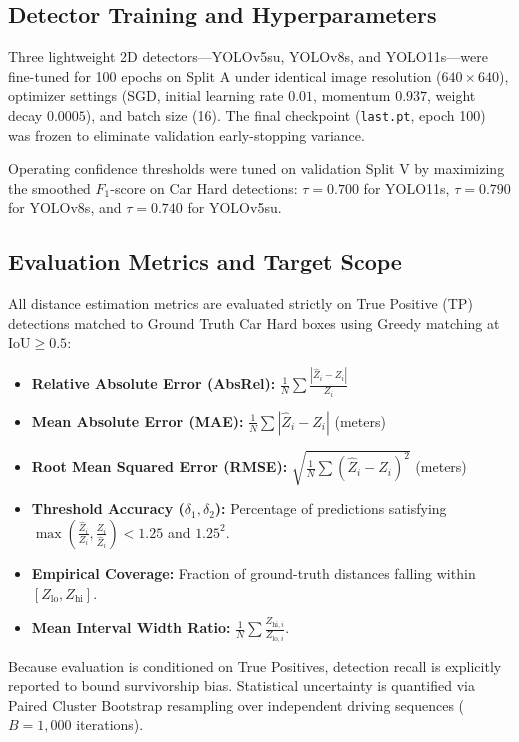 \documentclass[]{spie}  %
\begin{document}
\subsection{Detector Training and Hyperparameters}
Three lightweight 2D detectors---YOLOv5su, YOLOv8s, and YOLO11s---were fine-tuned for 100 epochs on Split A under identical image resolution ($640 \times 640$), optimizer settings (SGD, initial learning rate $0.01$, momentum $0.937$, weight decay $0.0005$), and batch size (16). The final checkpoint (\texttt{last.pt}, epoch 100) was frozen to eliminate validation early-stopping variance.

Operating confidence thresholds were tuned on validation Split V by maximizing the smoothed $F_1$-score on Car Hard detections: $\tau = 0.700$ for YOLO11s, $\tau = 0.790$ for YOLOv8s, and $\tau = 0.740$ for YOLOv5su.

\subsection{Evaluation Metrics and Target Scope}
All distance estimation metrics are evaluated strictly on True Positive (TP) detections matched to Ground Truth Car Hard boxes using Greedy matching at $\text{IoU} \ge 0.5$:
\begin{itemize}
    \item \textbf{Relative Absolute Error (AbsRel):} $\frac{1}{N} \sum \frac{|\hat{Z}_i - Z_i|}{Z_i}$
    \item \textbf{Mean Absolute Error (MAE):} $\frac{1}{N} \sum |\hat{Z}_i - Z_i|$ (meters)
    \item \textbf{Root Mean Squared Error (RMSE):} $\sqrt{\frac{1}{N} \sum (\hat{Z}_i - Z_i)^2}$ (meters)
    \item \textbf{Threshold Accuracy ($\delta_1, \delta_2$):} Percentage of predictions satisfying $\max(\frac{\hat{Z}_i}{Z_i}, \frac{Z_i}{\hat{Z}_i}) < 1.25$ and $1.25^2$.
    \item \textbf{Empirical Coverage:} Fraction of ground-truth distances falling within $[Z_{\text{lo}}, Z_{\text{hi}}]$.
    \item \textbf{Mean Interval Width Ratio:} $\frac{1}{N} \sum \frac{Z_{\text{hi}, i}}{Z_{\text{lo}, i}}$.
\end{itemize}

Because evaluation is conditioned on True Positives, detection recall is explicitly reported to bound survivorship bias. Statistical uncertainty is quantified via Paired Cluster Bootstrap resampling over independent driving sequences ($B = 1,000$ iterations).
\end{document}

